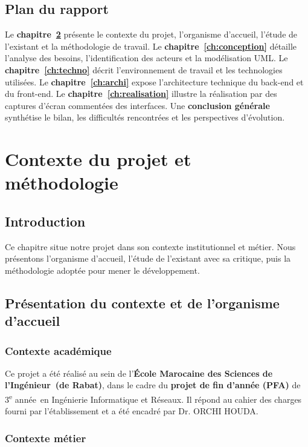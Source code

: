 \documentclass[11pt,a4paper,oneside]{report}
\newcommand{\encadrante}{Dr. ORCHI HOUDA}
\newcommand{\ecole}{École Marocaine des Sciences de l'Ingénieur}
\newcommand{\villeecole}{de Rabat}
\newcommand{\filiere}{Ingénierie Informatique et Réseaux}
\newcommand{\niveau}{3\textsuperscript{e} année}
\begin{document}
\section{Plan du rapport}

Le \textbf{chapitre~\ref{ch:contexte}} présente le contexte du projet, l'organisme d'accueil, l'étude de l'existant et la méthodologie de travail. Le \textbf{chapitre~\ref{ch:conception}} détaille l'analyse des besoins, l'identification des acteurs et la modélisation UML. Le \textbf{chapitre~\ref{ch:techno}} décrit l'environnement de travail et les technologies utilisées. Le \textbf{chapitre~\ref{ch:archi}} expose l'architecture technique du back-end et du front-end. Le \textbf{chapitre~\ref{ch:realisation}} illustre la réalisation par des captures d'écran commentées des interfaces. Une \textbf{conclusion générale} synthétise le bilan, les difficultés rencontrées et les perspectives d'évolution.

\chapter{Contexte du projet et méthodologie}
\label{ch:contexte}

\section{Introduction}

Ce chapitre situe notre projet dans son contexte institutionnel et métier. Nous présentons l'organisme d'accueil, l'étude de l'existant avec sa critique, puis la méthodologie adoptée pour mener le développement.

\section{Présentation du contexte et de l'organisme d'accueil}

\subsection{Contexte académique}

Ce projet a été réalisé au sein de l'\textbf{\ecole\ (\villeecole)}, dans le cadre du \textbf{projet de fin d'année (PFA)} de \niveau\ en \filiere. Il répond au cahier des charges fourni par l'établissement et a été encadré par \encadrante.

\subsection{Contexte métier}
\end{document}
